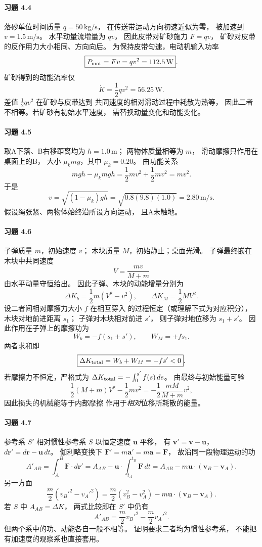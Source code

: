 \paragraph{习题 4.4}
落砂单位时间质量 \(q=50\,\mathrm{kg/s}\)，
在传送带运动方向初速近似为零，
被加速到 \(v=1.5\,\mathrm{m/s}\)。
水平动量流增量为 \(qv\)，
因此皮带对矿砂施力 \(F=qv\)，
矿砂对皮带的反作用力大小相同、方向向后。
为保持皮带匀速，电动机输入功率
\[
 \boxed{P_{\rm mot}=Fv=qv^2=112.5\,\mathrm W}.
\]
矿砂得到的动能流率仅
\[
 \boxed{\dot K=\frac12qv^2=56.25\,\mathrm W}.
\]
差值 \(\frac12qv^2\) 在矿砂与皮带达到
共同速度的相对滑动过程中耗散为热等，
因此二者不相等。若矿砂有初始水平速度，
需替换动量变化和动能变化。

\paragraph{习题 4.5}
取A下落、B右移距离均为 \(h=1.0\,\mathrm m\)；
两物体质量相等为 \(m\)，
滑动摩擦只作用在桌面上的B，
大小 \(\mu_kmg\)，其中 \(\mu_k=0.20\)。
由功能关系
\[
 mgh-\mu_kmgh=\frac12mv^2+\frac12mv^2
 =mv^2.
\]
于是
\[
 \boxed{v=\sqrt{(1-\mu_k)gh}
 =\sqrt{0.8(9.8)(1.0)}=2.80\,\mathrm{m/s}}.
\]
假设绳张紧、两物体始终沿所设方向运动，
且A未触地。

\paragraph{习题 4.6}
子弹质量 \(m\)，初始速度 \(v\)；
木块质量 \(M\)，初始静止；桌面光滑。
子弹最终嵌在木块中共同速度
\[
 \boxed{V=\frac{mv}{M+m}}
\]
由水平动量守恒给出。
因此子弹、木块的动能增量分别为
\[
 \boxed{\Delta K_b=\frac12m(V^2-v^2)},\qquad
 \boxed{\Delta K_M=\frac12MV^2}.
\]
设二者间相对摩擦力大小 \(f\) 在相互穿入
的过程恒定（或理解下式为对应积分），
木块对地前进距离 \(s_1\)；
子弹对木块相对前进 \(s'\)，
则子弹对地位移为 \(s_1+s'\)。
因此作用在子弹上的摩擦功为
\[
 W_b=-f(s_1+s'),\qquad
 W_M=+fs_1.
\]
两者求和即
\[
 \boxed{\Delta K_{\rm total}=W_b+W_M=-fs'<0}.
\]
若摩擦力不恒定，严格式为
\(\Delta K_{\rm total}=-\int_0^{s'}f(s)\,ds\)。
由最终与初始能量可验
\[
 \frac12(M+m)V^2-\frac12mv^2
 =-\frac12\frac{mM}{M+m}v^2,
\]
因此损失的机械能等于内部摩擦
作用于\emph{相对}位移所耗散的能量。

\paragraph{习题 4.7}
参考系 \(S'\) 相对惯性参考系 \(S\)
以恒定速度 \(\boldsymbol u\) 平移，
有 \(\boldsymbol v'=\boldsymbol v-\boldsymbol u\)，
\(d\boldsymbol r'=d\boldsymbol r-\boldsymbol u\,dt\)。
伽利略变换下 \(\boldsymbol F'=m\boldsymbol a'=
m\boldsymbol a=\boldsymbol F\)，
故沿同一段物理运动的功
\[
 A'_{AB}
 =\int_A^B\boldsymbol F\cdot d\boldsymbol r'
 =A_{AB}-\boldsymbol u\cdot
 \int_{t_A}^{t_B}\boldsymbol F\,dt
 =A_{AB}-m\boldsymbol u\cdot
 (\boldsymbol v_B-\boldsymbol v_A).
\]
另一方面
\[
 \frac m2(v_B'^2-v_A'^2)
 =\frac m2(v_B^2-v_A^2)
 -m\boldsymbol u\cdot
 (\boldsymbol v_B-\boldsymbol v_A).
\]
若 \(S\) 中 \(A_{AB}=\Delta K\)，
两式比较即在 \(S'\) 中仍有
\[
 \boxed{A'_{AB}=\frac m2v_B'^2-\frac m2v_A'^2}.
\]
但两个系中的功、动能各自一般不相等。
证明要求二者均为惯性参考系，
不能把有加速度的观察系也直接套用。

